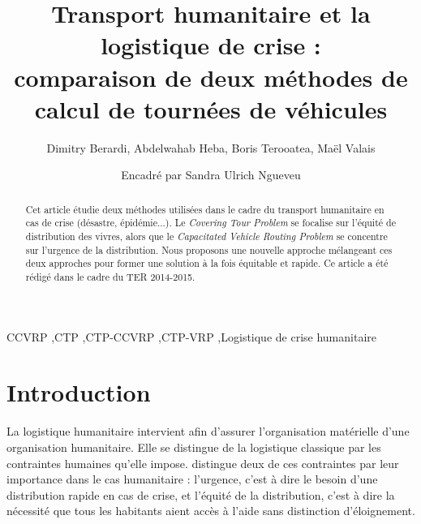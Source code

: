 \documentclass[5p,authoryear]{elsarticle}
\begin{document}
\begin{frontmatter}

\title{Transport humanitaire et la logistique de crise :\\ comparaison de deux méthodes de calcul de tournées de véhicules}

\author{Dimitry Berardi, Abdelwahab Heba, Boris Terooatea, Maël Valais}
\address{Université Toulouse 3 — Paul Sabatier, Toulouse}

\author{Encadré par Sandra Ulrich Ngueveu}
\address{LAAS-CNRS, Toulouse}

\begin{abstract}
%
%
Cet article  étudie deux méthodes utilisées dans le cadre du transport humanitaire en cas de crise (désastre, épidémie...). Le \emph{Covering Tour Problem} se focalise sur l'équité de distribution des vivres, alors que le \emph{Capacitated Vehicle Routing Problem} se concentre sur l'urgence de la distribution. Nous proposons une nouvelle approche mélangeant ces deux approches pour former une solution à la fois équitable et rapide.
Ce article a été rédigé dans le cadre du TER\footnotemark{} 2014-2015.

\end{abstract}

\begin{keyword}
CCVRP \sep CTP \sep CTP-CCVRP \sep CTP-VRP \sep Logistique de crise humanitaire\end{keyword}

\end{frontmatter}



\section{Introduction}\label{introduction}
La logistique humanitaire intervient afin d'assurer l'organisation matérielle d'une organisation humanitaire. Elle se distingue de la logistique classique par les contraintes humaines qu'elle impose. \cite{campbell_routing_2008} distingue deux de ces contraintes par leur importance dans le cas humanitaire : l'urgence, c'est à dire le besoin d'une distribution rapide en cas de crise, et l'équité de la distribution, c'est à dire la nécessité que tous les habitants aient accès à l'aide sans distinction d'éloignement.
\end{document}

